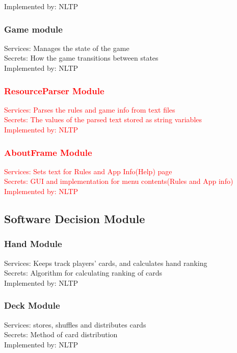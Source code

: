 \documentclass[11pt]{article}
\begin{document}
    Implemented by: NLTP\\

    \subsubsection{Game module}
    Services: Manages the state of the game\\
    Secrets: How the game transitions between states \\
    Implemented by: NLTP\\
    
   \textcolor{red}{\subsubsection{ResourceParser Module}
    \textcolor{red}{Services: Parses the rules and game info from text files}\\
    \textcolor{red}{Secrets: The values of the parsed text stored as string variables}\\
    \textcolor{red}{Implemented by: NLTP}\\}
    
    \textcolor{red}{\subsubsection{AboutFrame Module}
    \textcolor{red}{Services: Sets text for Rules and App Info(Help) page}\\
    \textcolor{red}{Secrets: GUI and implementation for menu contents(Rules and App info)}\\
    \textcolor{red}{Implemented by: NLTP}\\}

    \subsection{Software Decision Module}
    \subsubsection{Hand Module}
    Services: Keeps track players’ cards, and calculates hand ranking\\

    Secrets: Algorithm for calculating ranking of cards \\

    Implemented by: NLTP\\

    \subsubsection{Deck Module}
    Services: stores, shuffles and distributes cards\\
    Secrets: Method of card distribution\\
    Implemented by: NLTP\\
\end{document}
